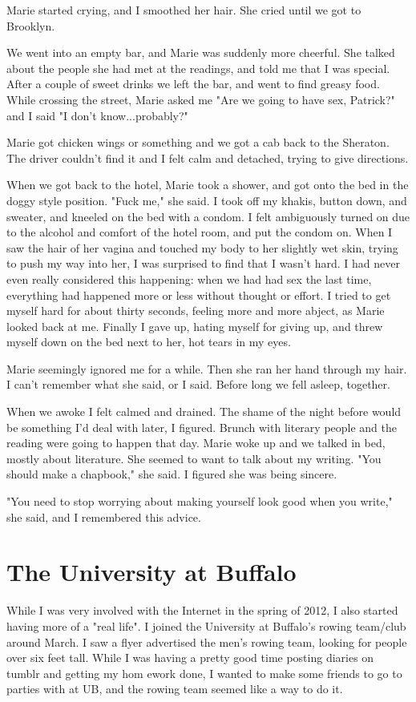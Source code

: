 \documentclass[12pt]{article}
\begin{document}
Marie started crying, and I smoothed her hair.  She cried until we got to
Brooklyn.

We went into an empty bar, and Marie was suddenly more cheerful.  She talked
about the people she had met at the readings, and told me that I was special.
After a couple of sweet drinks we left the bar, and went to find greasy food.
While crossing the street, Marie asked me "Are we going to have sex, Patrick?"
and I said "I don't know...probably?"  

Marie got chicken wings or something and we got a cab back to the Sheraton.  The
driver couldn't find it and I felt calm and detached, trying to give directions.  

When we got back to the hotel, Marie took a shower, and got onto the bed in the
doggy style position.  "Fuck me," she said.  I took off my khakis, button down,
and sweater, and kneeled on the bed with a condom.  I felt ambiguously turned on
due to the alcohol and comfort of the hotel room, and put the condom on.  When I
saw the hair of her vagina and touched my body to her slightly wet skin, trying
to push my way into her, I was surprised to find that I wasn't hard.  I had
never even really considered this happening: when we had had sex the last time,
everything had happened more or less without thought or effort.  I tried to get
myself hard for about thirty seconds, feeling more and more abject, as Marie
looked back at me.  Finally I gave up, hating myself for giving up, and threw
myself down on the bed next to her, hot tears in my eyes.

Marie seemingly ignored me for a while. Then she ran her hand through my hair.
I can't remember what she said, or I said.  Before long we fell asleep,
together.

When we awoke I felt calmed and drained.  The shame of the night before would be
something I'd deal with later, I figured.  Brunch with literary people and the
reading were going to happen that day.  Marie woke up and we talked in bed,
mostly about literature.  She seemed to want to talk about my writing.  "You
should make a chapbook," she said.  I figured she was being sincere.  

"You need to stop worrying about making yourself look good when you write," she
said, and I remembered this advice.

\section{The University at Buffalo}
While I was very involved with the Internet in the spring of 2012, I also
started having more of a "real life".  I joined the University at Buffalo's
rowing team/club around March.  I saw a flyer advertised the men's rowing team,
looking for people over six feet tall.  While I was having a pretty good time
posting diaries on tumblr and getting my hom ework done, I wanted to make some
friends to go to parties with at UB, and the  rowing team seemed like a way to do
it.  
\end{document}
